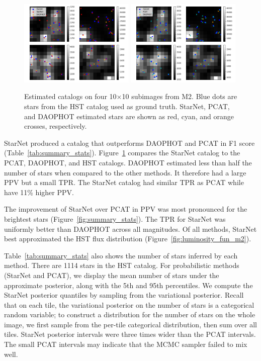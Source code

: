 \begin{figure}[tb]
    \centering
    \includegraphics[width=0.49\textwidth]{figures/m2_results/example_subimages_starnet.png}
    \includegraphics[width=0.49\textwidth]{figures/m2_results/example_subimages_pcat.png}
    \caption{Estimated catalogs on four 10$\times$10 subimages from
    M2. Blue dots are stars from the HST catalog used as ground truth.
    StarNet, PCAT, and DAOPHOT estimated stars are shown as
    red, cyan, and orange crosses, respectively. }
    \label{fig:example_subimages}
\end{figure}

StarNet produced a catalog that outperforms DAOPHOT and PCAT in F1 score (Table~\ref{tab:summary_stats}).
Figure~\ref{fig:example_subimages} compares the StarNet catalog to the PCAT, DAOPHOT, and HST catalogs.
DAOPHOT estimated less than half the number of stars when compared to the other methods.
It therefore had a large PPV but a small TPR.
The StarNet catalog had similar TPR as PCAT while have 11\% higher PPV.

The improvement of StarNet over PCAT in PPV was most pronounced for the brightest stars (Figure~\ref{fig:summary_stats}).
The TPR for StarNet was uniformly better than DAOPHOT across all magnitudes.
Of all methods, StarNet best approximated the HST flux distribution (Figure~\ref{fig:luminosity_fun_m2}).

Table~\ref{tab:summary_stats} also shows the number of stars inferred by each method.
There are 1114 stars in the HST catalog.
For probabilistic methods (StarNet and PCAT),
we display the mean number of stars under the approximate posterior, along with the 5th and 95th percentiles.
We compute the StarNet posterior quantiles by sampling from the variational posterior. 
Recall that on each tile, the variational posterior on the number of stars is a categorical random variable; 
to construct a distribution for the number of stars on the whole image, we first sample from the per-tile categorical distribution, then sum over all tiles. 
StarNet posterior intervals were three times wider than the PCAT intervals.
The small PCAT intervals may indicate that the MCMC sampler failed to mix well.

